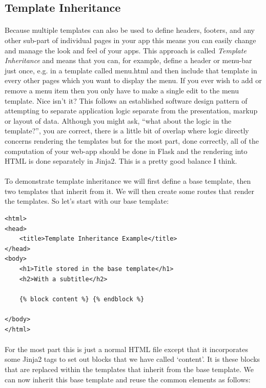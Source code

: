 \documentclass[12pt, a4paper, twoside]{book}
\begin{document}
\subsection{Template Inheritance}
\label{template-inheritance}
\paragraph{} Because multiple templates can also be used to define headers, footers, and any other sub-part of individual pages in your app this means you can easily change and manage the look and feel of your apps. This approach is called \emph{Template Inheritance} and means that you can, for example, define a header or menu-bar just once, e.g. in a template called menu.html and then include that template in every other pages which you want to display the menu. If you ever wish to add or remove a menu item then you only have to make a single edit to the menu template. Nice isn't it? This follows an established software design pattern of attempting to separate application logic separate from the presentation, markup or layout of data. Although you might ask, ``what about the logic in the template?'', you are correct, there is a little bit of overlap where logic directly concerns rendering the templates but for the most part, done correctly, all of the computation of your web-app should be done in Flask and the rendering into HTML is done separately in Jinja2. This is a pretty good balance I think.

\paragraph{} To demonstrate template inheritance we will first define a base template, then two templates that inherit from it. We will then create some routes that render the templates. So let's start with our base template:

\begin{lstlisting}
<html>
<head>
    <title>Template Inheritance Example</title>
</head>
<body>
    <h1>Title stored in the base template</h1>
    <h2>With a subtitle</h2>

    {% block content %} {% endblock %}

</body>
</html>
\end{lstlisting}

\paragraph{} For the most part this is just a normal HTML file except that it incorporates some Jinja2 tags to set out blocks that we have called `content'. It is these blocks that are replaced within the templates that inherit from the base template. We can now inherit this base template and reuse the common elements as follows:
\end{document}
